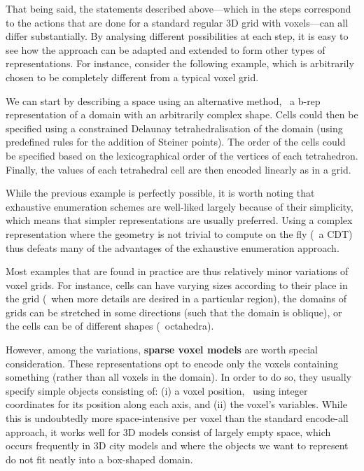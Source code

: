 That being said, the statements described above---which in the steps correspond to the actions that are done for a standard regular 3D grid with voxels---can all differ substantially.
By analysing different possibilities at each step, it is easy to see how the approach can be adapted and extended to form other types of representations.
For instance, consider the following example, which is arbitrarily chosen to be completely different from a typical voxel grid.

We can start by describing a space using an alternative method, \eg\ a b-rep representation of a domain with an arbitrarily complex shape.
Cells could then be specified using a constrained Delaunay tetrahedralisation of the domain (using predefined rules for the addition of Steiner points).
The order of the cells could be specified based on the lexicographical order of the vertices of each tetrahedron.
Finally, the values of each tetrahedral cell are then encoded linearly as in a grid.

While the previous example is perfectly possible, it is worth noting that exhaustive enumeration schemes are well-liked largely because of their simplicity, which means that simpler representations are usually preferred.
Using a complex representation where the geometry is not trivial to compute on the fly (\eg\ a CDT) thus defeats many of the advantages of the exhaustive enumeration approach.

Most examples that are found in practice are thus relatively minor variations of voxel grids.
For instance, cells can have varying sizes according to their place in the grid (\eg\ when more details are desired in a particular region), the domains of grids can be stretched in some directions (such that the domain is oblique), or the cells can be of different shapes (\eg\ octahedra).

However, among the variations, \textbf{sparse voxel models} are worth special consideration.
These representations opt to encode only the voxels containing something (rather than all voxels in the domain).
In order to do so, they usually specify simple objects consisting of: (i) a voxel position, \eg\ using integer coordinates for its position along each axis, and (ii) the voxel's variables.
While this is undoubtedly more space-intensive per voxel than the standard encode-all approach, it works well for 3D models consist of largely empty space, which occurs frequently in 3D city models and where the objects we want to represent do not fit neatly into a box-shaped domain.

